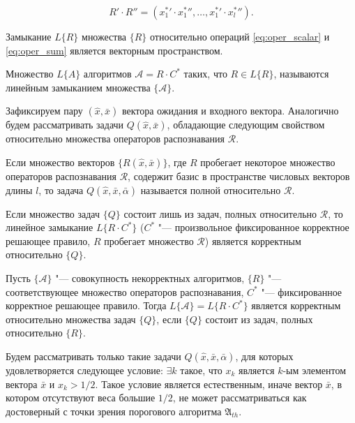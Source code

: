 \begin{equation}
\label{eq:oper_mult}
	R'{\cdot}R''=({x_1^*}'{\cdot}{x_1^*}'',\dots,{x_1^*}'{\cdot}{x_l^*}'').
\end{equation}
	
\begin{Pred}
	Замыкание $L\{R\}$ множества $\{R\}$ относительно операций \eqref{eq:oper_scalar} и \eqref{eq:oper_sum} является векторным пространством.
\end{Pred}

\begin{Def}
	Множество $L\{A\}$ алгоритмов $\mathcal{A}=R{\cdot}C^*$ таких, что $R{\in}L\{R\}$, называются линейным замыканием множества $\{\mathcal{A}\}$.
\end{Def}

Зафиксируем пару $(\hat{x},\bar{x})$ вектора ожидания и входного вектора. Аналогично \cite{Zhuravlev1977} будем рассматривать задачи $Q(\hat{x},\bar{x})$, обладающие следующим свойством относительно множества операторов распознавания $\mathcal{R}$.
	
\begin{Def}
	Если множество векторов $\{R(\hat{x},\bar{x})\}$, где $R$ пробегает некоторое множество операторов распознавания $\mathcal{R}$, содержит базис в пространстве числовых векторов длины $l$, то задача $Q(\hat{x},\bar{x},\bar{\alpha})$ называется полной относительно $\mathcal{R}$.
\end{Def}

\begin{Pred}
	\label{pred:correctness}
	Если множество задач $\{Q\}$ состоит лишь из задач, полных относительно $\mathcal R$, то линейное замыкание $L\{R{\cdot}C^*\}$ ($C^*$ "--- произвольное фиксированное корректное решающее правило, $R$ пробегает множество $\mathcal{R}$) является корректным относительно $\{Q\}$.
\end{Pred}

\begin{Corollary}
	Пусть $\{\mathcal{A}\}$ "--- совокупность некорректных алгоритмов, $\{R\}$ "--- соответствующее множество операторов распознавания, $C^*$ "--- фиксированное корректное решающее правило. Тогда $L\{\mathcal{A}\}=L\{R{\cdot}C^*\}$ является корректным относительно множества задач $\{Q\}$, если $\{Q\}$ состоит из задач, полных относительно $\{R\}$.
\end{Corollary}

Будем рассматривать только такие задачи $Q(\hat{x},\bar{x},\bar{\alpha})$, для которых удовлетворяется следующее условие: ${\exists}k$ такое, что $x_k$ является $k$-ым элементом вектора $\bar{x}$ и $x_k>1/2$. Такое условие является естественным, иначе вектор $\bar{x}$, в котором отсутствуют веса большие $1/2$, не может рассматриваться как достоверный с точки зрения порогового алгоритма $\mathfrak A_{th}$.
	
